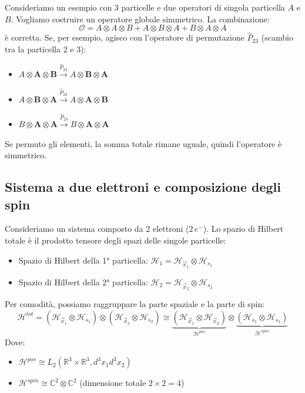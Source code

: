 \begin{example}
    Consideriamo un esempio con 3 particelle e due operatori di singola particella \(A\) e \(B\). Vogliamo costruire un operatore globale simmetrico.
    La combinazione:
    \[
        \mathcal{O} = A\otimes A \otimes B + A\otimes B \otimes A + B\otimes A \otimes A
    \]
    è corretta. Se, per esempio, agisco con l'operatore di permutazione \(\hat{P}_{23}\) (scambio tra la particella 2 e 3):
    \begin{itemize}
        \item \(A\otimes \mathbf{A} \otimes \mathbf{B} \xrightarrow{\hat{P}_{23}} A\otimes \mathbf{B} \otimes \mathbf{A}\)
        \item \(A\otimes \mathbf{B} \otimes \mathbf{A} \xrightarrow{\hat{P}_{23}} A\otimes \mathbf{A} \otimes \mathbf{B}\)
        \item \(B\otimes \mathbf{A} \otimes \mathbf{A} \xrightarrow{\hat{P}_{23}} B\otimes \mathbf{A} \otimes \mathbf{A}\)
    \end{itemize}
    Se permuto gli elementi, la somma totale rimane uguale, quindi l'operatore è simmetrico.
\end{example}

\subsection{Sistema a due elettroni e composizione degli spin}

Consideriamo un sistema composto da 2 elettroni ($2\,e^-$). Lo spazio di Hilbert totale è il prodotto tensore degli spazi delle singole particelle:
\begin{itemize}
    \item Spazio di Hilbert della 1° particella: \(\mathcal{H}_1 = \mathcal{H}_{\vec{x}_1} \otimes \mathcal{H}_{s_1}\)
    \item Spazio di Hilbert della 2° particella: \(\mathcal{H}_2 = \mathcal{H}_{\vec{x}_2} \otimes \mathcal{H}_{s_2}\)
\end{itemize}
Per comodità, possiamo raggruppare la parte spaziale e la parte di spin:
\[
    \mathcal{H}^{tot} = (\mathcal{H}_{\vec{x}_1} \otimes \mathcal{H}_{s_1}) \otimes (\mathcal{H}_{\vec{x}_2} \otimes \mathcal{H}_{s_2}) 
    \cong \underbrace{(\mathcal{H}_{\vec{x}_1} \otimes \mathcal{H}_{\vec{x}_2})}_{\mathcal{H}^{pos}} \otimes \underbrace{(\mathcal{H}_{s_1} \otimes \mathcal{H}_{s_2})}_{\mathcal{H}^{spin}}
\]
Dove:
\begin{itemize}
    \item \(\mathcal{H}^{pos} \cong L_2(\mathbb{R}^3 \times \mathbb{R}^3, d^3x_1 d^3x_2)\)
    \item \(\mathcal{H}^{spin} \cong \mathbb{C}^2 \otimes \mathbb{C}^2\) (dimensione totale \(2\times2=4\))
\end{itemize}

